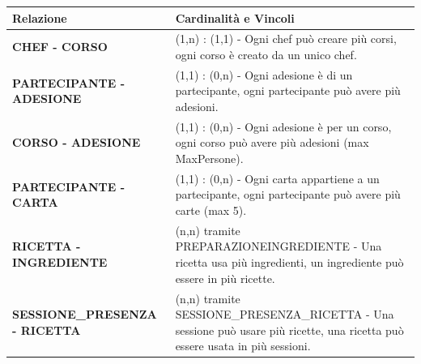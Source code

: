 \begin{center}
\begin{tcolorbox}[colback=white!98!gray, colframe=myblue!80!black, title=Vincoli di Molteplicità, arc=4mm, boxrule=0.8pt, width=0.98\textwidth]
\renewcommand{\arraystretch}{1.2}
\begin{tabularx}{\textwidth}{p{5cm}X}
\textbf{Relazione} & \textbf{Cardinalità e Vincoli} \\
\hline
\textbf{CHEF - CORSO} & (1,n) : (1,1) - Ogni chef può creare più corsi, ogni corso è creato da un unico chef. \\
\hline
\textbf{PARTECIPANTE - ADESIONE} & (1,1) : (0,n) - Ogni adesione è di un partecipante, ogni partecipante può avere più adesioni. \\
\hline
\textbf{CORSO - ADESIONE} & (1,1) : (0,n) - Ogni adesione è per un corso, ogni corso può avere più adesioni (max MaxPersone). \\
\hline
\textbf{PARTECIPANTE - CARTA} & (1,1) : (0,n) - Ogni carta appartiene a un partecipante, ogni partecipante può avere più carte (max 5). \\
\hline
\textbf{RICETTA - INGREDIENTE} & (n,n) tramite PREPARAZIONEINGREDIENTE - Una ricetta usa più ingredienti, un ingrediente può essere in più ricette. \\
\hline
\textbf{SESSIONE\_PRESENZA - RICETTA} & (n,n) tramite SESSIONE\_PRESENZA\_RICETTA - Una sessione può usare più ricette, una ricetta può essere usata in più sessioni. \\
\hline
\end{tabularx}
\end{tcolorbox}
\end{center}



